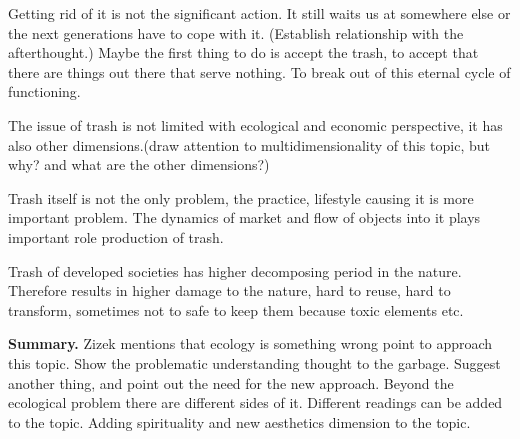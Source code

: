 Getting rid of it is not the significant action. It still waits us at somewhere else or the next generations have to cope with it. (Establish relationship with the afterthought.) Maybe the first thing to do is accept the trash, to accept that there are things out there that serve nothing. To break out of this eternal cycle of functioning.

The issue of trash is not limited with ecological and economic perspective, it has also other dimensions.(draw attention to multidimensionality of this topic, but why? and what are the other dimensions?)

Trash itself is not the only problem, the practice, lifestyle causing it is more important problem. The dynamics of market and flow of objects into it plays important role production of trash.

Trash of developed societies has higher decomposing period in the nature. Therefore results in higher damage to the nature, hard to reuse, hard to transform, sometimes not to safe to keep them because toxic elements etc. 

\textbf{Summary.} Zizek mentions that ecology is something wrong point to approach this topic. Show the problematic understanding thought to the garbage. Suggest another thing, and point out the need for the new approach. Beyond the ecological problem there are different sides of it. Different readings can be added to the topic. Adding spirituality and new aesthetics dimension to the topic. 


